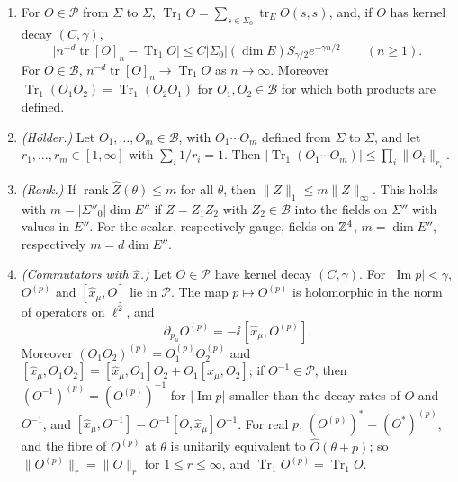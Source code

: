 \begin{lemma}\label{lem:ol-trace-tools}
\begin{enumerate}[label=(\alph*)]
\item For $O\in\mathscr P$ from $\Sigma$ to $\Sigma$, $\operatorname{Tr}_1O=\sum_{s\in\Sigma_0}\operatorname{tr}_EO(s,s)$, and, if $O$ has kernel decay $(C,\gamma)$,
\[
\big|n^{-d}\operatorname{tr}[O]_n-\operatorname{Tr}_1O\big|\le C|\Sigma_0|(\dim E)S_{\gamma/2}e^{-\gamma n/2}\qquad(n\ge1).
\]
For $O\in\mathscr B$, $n^{-d}\operatorname{tr}[O]_n\to\operatorname{Tr}_1O$ as $n\to\infty$. Moreover $\operatorname{Tr}_1(O_1O_2)=\operatorname{Tr}_1(O_2O_1)$ for $O_1,O_2\in\mathscr B$ for which both products are defined.
\item \emph{(H\"older.)} Let $O_1,\dots,O_m\in\mathscr B$, with $O_1\cdots O_m$ defined from $\Sigma$ to $\Sigma$, and let $r_1,\dots,r_m\in[1,\infty]$ with $\sum_i1/r_i=1$. Then $|\operatorname{Tr}_1(O_1\cdots O_m)|\le\prod_i\|O_i\|_{r_i}$.
\item \emph{(Rank.)} If $\operatorname{rank}\hat Z(\theta)\le m$ for all $\theta$, then $\|Z\|_1\le m\|Z\|_\infty$. This holds with $m=|\Sigma''_0|\dim E''$ if $Z=Z_1Z_2$ with $Z_2\in\mathscr B$ into the fields on $\Sigma''$ with values in $E''$. For the scalar, respectively gauge, fields on $\mathbb Z^4$, $m=\dim E''$, respectively $m=d\dim E''$.
\item \emph{(Commutators with $\hat x$.)} Let $O\in\mathscr P$ have kernel decay $(C,\gamma)$. For $|\operatorname{Im}p|<\gamma$, $O^{(p)}$ and $[\hat x_\mu,O]$ lie in $\mathscr P$. The map $p\mapsto O^{(p)}$ is holomorphic in the norm of operators on $\ell^2$, and
\[
\partial_{p_\mu}O^{(p)}=-\ii\,[\hat x_\mu,O^{(p)}].
\]
Moreover $(O_1O_2)^{(p)}=O_1^{(p)}O_2^{(p)}$ and $[\hat x_\mu,O_1O_2]=[\hat x_\mu,O_1]O_2+O_1[\hat x_\mu,O_2]$; if $O^{-1}\in\mathscr P$, then $(O^{-1})^{(p)}=(O^{(p)})^{-1}$ for $|\operatorname{Im}p|$ smaller than the decay rates of $O$ and $O^{-1}$, and $[\hat x_\mu,O^{-1}]=O^{-1}[O,\hat x_\mu]O^{-1}$. For real $p$, $(O^{(p)})^*=(O^*)^{(p)}$, and the fibre of $O^{(p)}$ at $\theta$ is unitarily equivalent to $\hat O(\theta+p)$; so $\|O^{(p)}\|_r=\|O\|_r$ for $1\le r\le\infty$, and $\operatorname{Tr}_1O^{(p)}=\operatorname{Tr}_1O$.
\end{enumerate}
\end{lemma}

